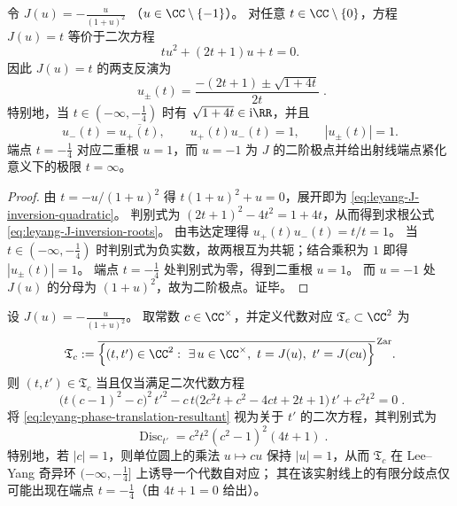\begin{theorem}\label{thm:leyang-J-explicit-inversion}
令
\(
J(u)=-\frac{u}{(1+u)^2}
\)
（\(u\in\CC\setminus\{-1\}\)）。
对任意 \(t\in\CC\setminus\{0\}\)，方程 \(J(u)=t\) 等价于二次方程
\begin{equation}\label{eq:leyang-J-inversion-quadratic}
t u^2+(2t+1)u+t=0.
\end{equation}
因此 \(J(u)=t\) 的两支反演为
\begin{equation}\label{eq:leyang-J-inversion-roots}
\boxed{\;
u_{\pm}(t)=\frac{-(2t+1)\pm\sqrt{1+4t}}{2t}\; }.
\end{equation}
特别地，当 \(t\in(-\infty,-\tfrac14)\) 时有 \(\sqrt{1+4t}\in\mathrm{i}\RR\)，并且
\[
u_-(t)=\overline{u_+(t)},\qquad u_+(t)u_-(t)=1,\qquad |u_{\pm}(t)|=1.
\]
端点 \(t=-\tfrac14\) 对应二重根 \(u=1\)，而 \(u=-1\) 为 \(J\) 的二阶极点并给出射线端点紧化意义下的极限 \(t=\infty\)。
\end{theorem}
\begin{proof}
由 \(t=-u/(1+u)^2\) 得 \(t(1+u)^2+u=0\)，展开即为 \eqref{eq:leyang-J-inversion-quadratic}。
判别式为 \((2t+1)^2-4t^2=1+4t\)，从而得到求根公式 \eqref{eq:leyang-J-inversion-roots}。
由韦达定理得 \(u_+(t)u_-(t)=t/t=1\)。
当 \(t\in(-\infty,-\tfrac14)\) 时判别式为负实数，故两根互为共轭；结合乘积为 \(1\) 即得 \(|u_{\pm}(t)|=1\)。
端点 \(t=-\tfrac14\) 处判别式为零，得到二重根 \(u=1\)。
而 \(u=-1\) 处 \(J(u)\) 的分母为 \((1+u)^2\)，故为二阶极点。证毕。
\end{proof}

\begin{proposition}\label{prop:leyang-phase-translation-correspondence-discriminant}
设 \(J(u)=-\frac{u}{(1+u)^2}\)。
取常数 \(c\in\CC^{\times}\)，并定义代数对应 \(\mathfrak{T}_c\subset\CC^2\) 为
\[
\mathfrak{T}_c
:=
\overline{
\Bigl\{(t,t')\in\CC^2:\ \exists\,u\in\CC^{\times},\ t=J(u),\ t'=J(cu)\Bigr\}
}^{\,\mathrm{Zar}}.
\]
则 \((t,t')\in\mathfrak{T}_c\) 当且仅当满足二次代数方程
\begin{equation}\label{eq:leyang-phase-translation-resultant}
\boxed{\;
\bigl(t(c-1)^2-c\bigr)^2\,t'^2
-c\,t\bigl(2c^2t+c^2-4ct+2t+1\bigr)\,t'
+c^2t^2
=0\; }.
\end{equation}
将 \eqref{eq:leyang-phase-translation-resultant} 视为关于 \(t'\) 的二次方程，其判别式为
\begin{equation}\label{eq:leyang-phase-translation-discriminant}
\boxed{\;
\operatorname{Disc}_{t'}
=c^2t^2(c^2-1)^2(4t+1)\; }.
\end{equation}
特别地，若 \(|c|=1\)，则单位圆上的乘法 \(u\mapsto cu\) 保持 \(|u|=1\)，从而 \(\mathfrak{T}_c\) 在 Lee--Yang 奇异环 \((-\infty,-\tfrac14]\) 上诱导一个代数自对应；
其在该实射线上的有限分歧点仅可能出现在端点 \(t=-\tfrac14\)（由 \(4t+1=0\) 给出）。
\end{proposition}


